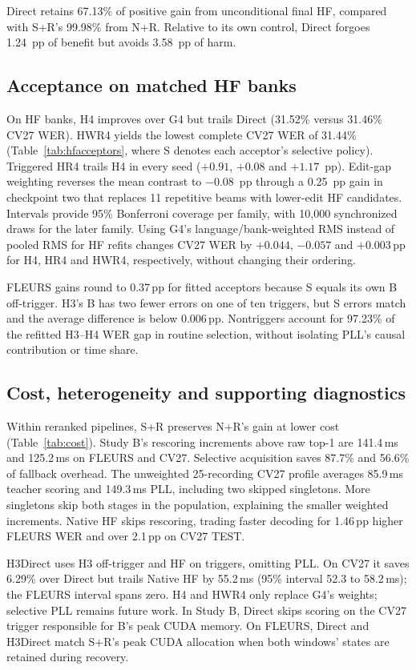 Direct retains 67.13\% of positive gain from unconditional final HF, compared with S+R's 99.98\% from N+R. Relative to its own control, Direct forgoes 1.24~pp of benefit but avoids 3.58~pp of harm.


\subsection{Acceptance on matched HF banks}
On HF banks, H4 improves over G4 but trails Direct (31.52\% versus 31.46\% CV27 WER). HWR4 yields the lowest complete CV27 WER of 31.44\% (Table~\ref{tab:hfacceptors}, where S denotes each acceptor's selective policy). Triggered HR4 trails H4 in every seed ($+0.91$, $+0.08$ and $+1.17$~pp). Edit-gap weighting reverses the mean contrast to $-0.08$~pp through a 0.25~pp gain in checkpoint two that replaces 11 repetitive beams with lower-edit HF candidates. Intervals provide 95\% Bonferroni coverage per family, with 10,000 synchronized draws for the later family. Using G4's language/bank-weighted RMS instead of pooled RMS for HF refits changes CV27 WER by $+0.044$, $-0.057$ and $+0.003$\,pp for H4, HR4 and HWR4, respectively, without changing their ordering.

FLEURS gains round to 0.37\,pp for fitted acceptors because S equals its own B off-trigger. H3's B has two fewer errors on one of ten triggers, but S errors match and the average difference is below 0.006\,pp. Nontriggers account for 97.23\% of the refitted H3--H4 WER gap in routine selection, without isolating PLL's causal contribution or time share.

\subsection{Cost, heterogeneity and supporting diagnostics}
Within reranked pipelines, S+R preserves N+R's gain at lower cost (Table~\ref{tab:cost}). Study B's rescoring increments above raw top-1 are 141.4\,ms and 125.2\,ms on FLEURS and CV27. Selective acquisition saves 87.7\% and 56.6\% of fallback overhead. The unweighted 25-recording CV27 profile averages 85.9\,ms teacher scoring and 149.3\,ms PLL, including two skipped singletons. More singletons skip both stages in the population, explaining the smaller weighted increments. Native HF skips rescoring, trading faster decoding for 1.46\,pp higher FLEURS WER and over 2.1\,pp on CV27 TEST.

H3Direct uses H3 off-trigger and HF on triggers, omitting PLL. On CV27 it saves 6.29\% over Direct but trails Native HF by 55.2\,ms (95\% interval 52.3 to 58.2\,ms); the FLEURS interval spans zero. H4 and HWR4 only replace G4's weights; selective PLL remains future work. In Study B, Direct skips scoring on the CV27 trigger responsible for B's peak CUDA memory. On FLEURS, Direct and H3Direct match S+R's peak CUDA allocation when both windows' states are retained during recovery.

